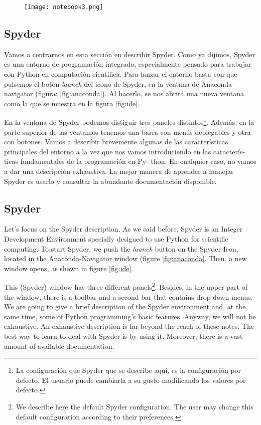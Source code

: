 \begin{figure}
\centering
    \texttt{[image: notebook3.png]}
    \label{fig:ntb3}
\end{figure} 

\begin{paracol}{2}
\subsection{Spyder}
Vamos a centrarnos en esta sección en describir Spyder. Como ya dijimos, Spyder es unn entorno de programación integrado, especialmente pensado para trabajar con Python en computación científica. Para lanzar el entorno basta con que pulsemos el botón \emph{launch} del icono de Spyder, en la ventana de Anaconda-navigator (figura: \ref{fig:anaconda}). Al hacerlo, se nos abrirá una nueva ventana como la que se muestra en la figura \ref{fig:ide}.

En la ventana de Spyder podemos distiguir tres paneles distintos\footnote{La configuración que Spyder que se describe  aquí, es la configuración por defecto. El usuario puede cambiarla a su gusto modificando los valores por defecto.}. Además, en la  parte superior de las ventamos tenemos una barra con menús deplegables y otra con botones. Vamos a describir brevemente algunas de las características principales del entorno a la vez que nos vamos introduciendo en las caracterís- ticas fundamentales de la programación en Py- thon. En cualquier caso, no vamos a dar una descripción exhaustiva. La mejor manera de aprender a manejar Spyder es usarlo y consultar la abundante documentación disponible.
\switchcolumn

\subsection{Spyder}
Let's focus on the Spyder description. As we said before, Spyder is an Integer Development Environment specially designed to use Python for scientific computing. To start Spyder, we push the \emph{launch} button on the Spyder Icon, located in the Anaconda-Navigator window (figure \ref{fig:anaconda}. Then, a new window opens, as shown in figure \ref{fig:ide}.

This (Spyder) window has three different panels\footnote{We describe here the default Spyder configuration. The user may change this default configuration according to their preferences.}. Besides, in the upper part of the window, there is a toolbar and a second bar that contains drop-down menus. We are going to give a brief description of the Spyder environment and, at the same time, some of Python programming's basic features. Anyway, we will not be exhaustive. An exhaustive description is far beyond the reach of these notes. The best way to learn to deal with Spyder is by using it. Moreover, there is a vast amount of available documentation.
\end{paracol}

